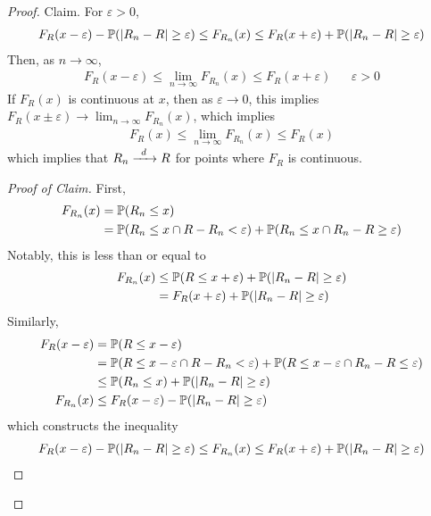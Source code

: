 \begin{proof}
    Claim. For $\varepsilon > 0$,
    \begin{align}
        F_R(x - \varepsilon) - \mathbb{P}(\abs{R_n - R} \ge \varepsilon) \le F_{R_n}(x) \le F_R(x + \varepsilon) + \mathbb{P}(\abs{R_n - R} \ge \varepsilon)
    \end{align}
    Then, as $n \to \infty$,
    \begin{align}
        F_R(x - \varepsilon) \le \lim_{n\to\infty} F_{R_n}(x) \le F_R(x + \varepsilon) && \varepsilon > 0
    \end{align}
    If $F_R(x)$ is continuous at $x$, then as $\varepsilon \to 0$, this implies $F_R(x \pm \varepsilon) \to \lim_{n\to\infty} F_{R_n}(x)$, which implies
    \begin{align}
        F_R(x) \le \lim_{n\to \infty} F_{R_n}(x) \le F_R(x)
    \end{align}
    which implies that $R_n \ce{->[$d$]} R$ for points where $F_R$ is continuous.
    \begin{proof}[Proof of Claim]
        First,
        \begin{align}
            F_{R_n}(x) &= \mathbb{P}(R_n \le x)\\
            &= \mathbb{P}(R_n \le x \cap R - R_n < \varepsilon) + \mathbb{P}(R_n \le x \cap R_n - R \ge \varepsilon)
        \end{align}
        Notably, this is less than or equal to
        \begin{align}
            F_{R_n}(x) &\le \mathbb{P}(R \le x + \varepsilon) + \mathbb{P}(\abs{R_n - R} \ge \varepsilon)\\
            &= F_R(x + \varepsilon) + \mathbb{P}(\abs{R_n - R} \ge \varepsilon)
        \end{align}
        Similarly,
        \begin{align}
            F_R(x - \varepsilon) &= \mathbb{P}(R \le x - \varepsilon)\\
            &= \mathbb{P}(R \le x - \varepsilon \cap R - R_n < \varepsilon) + \mathbb{P}(R \le x - \varepsilon \cap R_n - R \le \varepsilon)\\
            &\le \mathbb{P}(R_n \le x) + \mathbb{P}(\abs{R_n - R} \ge \varepsilon)\\
            F_{R_n}(x) &\le F_R(x - \varepsilon) - \mathbb{P}(\abs{R_n - R} \ge \varepsilon)
        \end{align}
        which constructs the inequality
        \begin{align}
            F_R(x - \varepsilon) - \mathbb{P}(\abs{R_n - R} \ge \varepsilon) \le F_{R_n}(x) \le F_R(x + \varepsilon) + \mathbb{P}(\abs{R_n - R} \ge \varepsilon)
        \end{align}
    \end{proof}
\end{proof}

